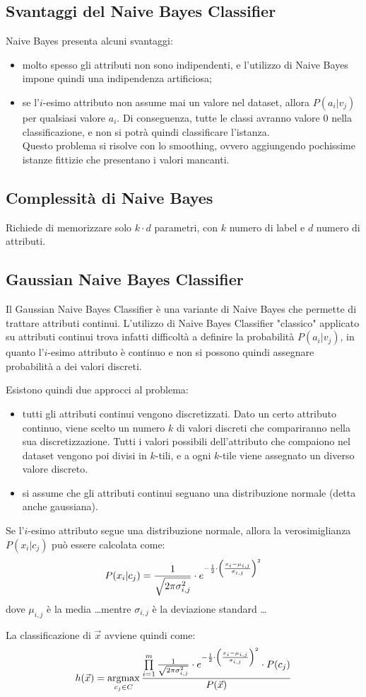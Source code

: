 \subsection{Svantaggi del Naive Bayes Classifier}
Naive Bayes presenta alcuni svantaggi:
\begin{itemize}
    \item molto spesso gli attributi non sono indipendenti, e l'utilizzo di Naive Bayes impone quindi una indipendenza artificiosa;
    \item se l'$i$-esimo attributo non assume mai un valore nel dataset, allora $P(a_i | v_j)$ per qualsiasi valore $a_i$. Di conseguenza, tutte le classi avranno valore $0$ nella classificazione, e non si potrà quindi classificare l'istanza.\\
    Questo problema si risolve con lo smoothing, ovvero aggiungendo pochissime istanze fittizie che presentano i valori mancanti.
\end{itemize}

\subsection{Complessità di Naive Bayes}
Richiede di memorizzare solo $k \cdot d$ parametri, con $k$ numero di label e $d$ numero di attributi.

\subsection{Gaussian Naive Bayes Classifier}
Il Gaussian Naive Bayes Classifier è una variante di Naive Bayes che permette di trattare attributi continui.
L'utilizzo di Naive Bayes Classifier "classico" applicato su attributi continui trova infatti difficoltà a definire la probabilità $P(a_i | v_j)$, in quanto l'$i$-esimo attributo è continuo e non si possono quindi assegnare probabilità a dei valori discreti.

Esistono quindi due approcci al problema:
\begin{itemize}
    \item tutti gli attributi continui vengono discretizzati. Dato un certo attributo continuo, viene scelto un numero $k$ di valori discreti che compariranno nella sua discretizzazione. Tutti i valori possibili dell'attributo che compaiono nel dataset vengono poi divisi in $k$-tili, e a ogni $k$-tile viene assegnato un diverso valore discreto.
    \item si assume che gli attributi continui seguano una distribuzione normale (detta anche gaussiana).
\end{itemize}

Se l'$i$-esimo attributo segue una distribuzione normale, allora la verosimiglianza $P(x_i | c_j)$ può essere calcolata come:
\[
    P(x_i | c_j) = \frac{1}{\sqrt{2 \pi \sigma_{i,j}^2}} \cdot e^{-\frac{1}{2} \cdot \left(\frac{x_i - \mu_{i,j}}{\sigma_{i,j}}\right)^2}
\]
dove $\mu_{i,j}$ è la media \ldots mentre $\sigma_{i,j}$ è la deviazione standard \ldots

La classificazione di $\Vec{x}$ avviene quindi come:
\[
    h(\Vec{x}) = \operatorname*{argmax}\limits_{c_j \in C} \frac{\prod\limits_{i=1}^m \frac{1}{\sqrt{2 \pi \sigma_{i,j}^2}} \cdot e^{-\frac{1}{2} \cdot \left(\frac{x_i - \mu_{i,j}}{\sigma_{i,j}}\right)^2} \cdot P(c_j)}{P(\Vec{x})}
\]